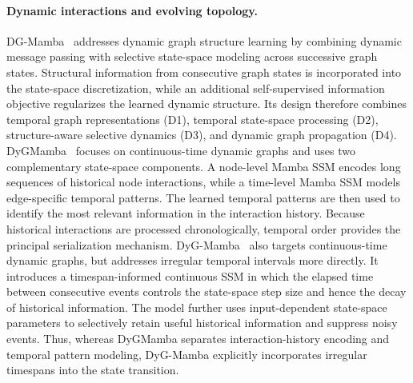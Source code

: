 \documentclass[acmsmall]{acmart}
\begin{document}
\paragraph{\textbf{Dynamic interactions and evolving topology.}}
DG-Mamba~\cite{yuan2025dg} addresses dynamic graph structure learning by
combining dynamic message passing with selective state-space modeling across
successive graph states. Structural information from consecutive graph states
is incorporated into the state-space discretization, while an additional
self-supervised information objective regularizes the learned dynamic
structure. Its design therefore combines temporal graph representations (D1),
temporal state-space processing (D2), structure-aware selective dynamics (D3),
and dynamic graph propagation (D4).
DyGMamba~\cite{ding2024dygmamba} focuses on continuous-time dynamic graphs and
uses two complementary state-space components. A node-level Mamba SSM encodes
long sequences of historical node interactions, while a time-level Mamba SSM
models edge-specific temporal patterns. The learned temporal patterns are then
used to identify the most relevant information in the interaction history.
Because historical interactions are processed chronologically, temporal order
provides the principal serialization mechanism.
DyG-Mamba~\cite{li2024dyg} also targets continuous-time dynamic graphs, but
addresses irregular temporal intervals more directly. It introduces a
timespan-informed continuous SSM in which the elapsed time between consecutive
events controls the state-space step size and hence the decay of historical
information. The model further uses input-dependent state-space parameters to
selectively retain useful historical information and suppress noisy events.
Thus, whereas DyGMamba separates interaction-history encoding and temporal
pattern modeling, DyG-Mamba explicitly incorporates irregular timespans into
the state transition.
\end{document}
